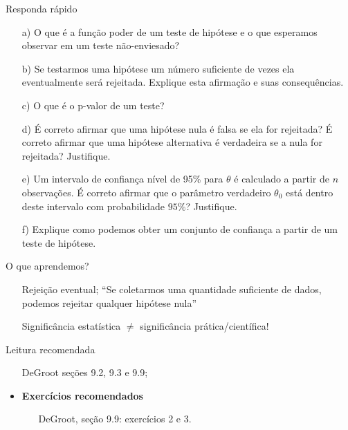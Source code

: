 \begin{frame}{Responda rápido}
   \begin{itemize}
    \item[a)] O que é a função poder de um teste de hipótese e o que esperamos observar em um teste não-enviesado?
    \item[b)] Se testarmos uma hipótese um número suficiente de vezes ela eventualmente será rejeitada.
    Explique esta afirmação e suas consequências.
    \item[c)] O que é o p-valor de um teste?
    \item[d)] É correto afirmar que uma hipótese nula é falsa se ela for rejeitada?
    É correto afirmar que uma hipótese alternativa é verdadeira se a nula for rejeitada? Justifique.
    \item[e)] Um intervalo de confiança nível de 95\% para $\theta$ é calculado a partir de $n$ observações.
    É correto afirmar que o parâmetro verdadeiro $\theta_0$ está dentro deste intervalo com probabilidade $95\%$? Justifique.
    \item[f)] Explique como podemos obter um conjunto de confiança a partir de um teste de hipótese.
  \end{itemize}
\end{frame}


\begin{frame}{O que aprendemos?}
\begin{itemize}
  \item[\faLightbulbO] Rejeição eventual;
  ``Se coletarmos uma quantidade suficiente de dados, podemos rejeitar qualquer hipótese nula''
  \item[\faLightbulbO] Significância estatística $\neq$ significância prática/científica!
   \end{itemize}
 \end{frame} 
 
\begin{frame}{Leitura recomendada}
\begin{itemize}
 \item[\faBook] DeGroot seções 9.2, 9.3 e 9.9;
   \item {\large\textbf{Exercícios recomendados}}
  \begin{itemize}
   \item[\faBookmark] DeGroot, seção 9.9: exercícios 2 e 3.   
  \end{itemize}
  \end{itemize}
\end{frame}
